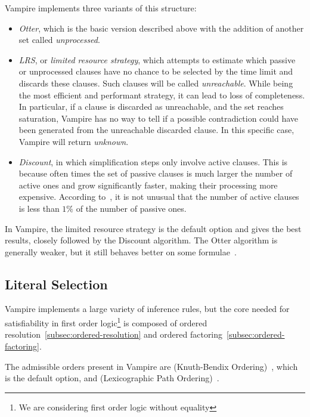 Vampire implements three variants of this structure:

\begin{itemize}
  \item \emph{Otter}, which is the basic version described above with the addition of another set called \emph{unprocessed}.
  \item \emph{LRS}, or \emph{limited resource strategy}, which attempts to estimate which passive or unprocessed clauses have no chance to be selected by the time limit and discards these clauses.
                    Such clauses will be called \emph{unreachable}.
                    While being the most efficient and performant strategy, it can lead to loss of completeness.
                    In particular, if a clause is discarded as unreachable, and the set reaches saturation, Vampire has no way to tell if a possible contradiction could have been generated from the unreachable discarded clause.
                    In this specific case, Vampire will return \emph{unknown}.
  \item \emph{Discount}, in which simplification steps only involve active clauses.
                          This is because often times the set of passive clauses is much larger the number of active ones and grow significantly faster, making their processing more expensive.
                          According to~\cite{kovacs2013vampire}, it is not unusual that the number of active clauses is less than \(1\%\) of the number of passive ones.
\end{itemize}

In Vampire, the limited resource strategy is the default option and gives the best results, closely followed by the Discount algorithm.
The Otter algorithm is generally weaker, but it still behaves better on some formulae~\cite{kovacs2013vampire}.

\subsection{Literal Selection}\label{subsec:literal-selection}

Vampire implements a large variety of inference rules, but the core needed for satisfiability in first order logic\footnote{
  We are considering first order logic without equality
} is composed of ordered resolution~\ref{subsec:ordered-resolution} and ordered factoring~\ref{subsec:ordered-factoring}.

The admissible orders present in Vampire are  (Knuth-Bendix Ordering)~\cite{knuth1970simple}, which is the default option, and  (Lexicographic Path Ordering)~\cite{dershowitz1982orderings}.

